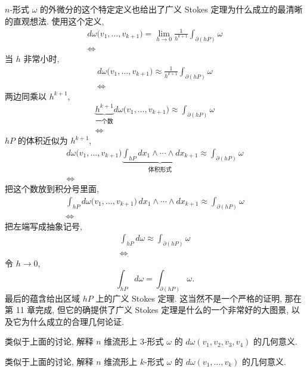 $n$-形式 $\omega$ 的外微分的这个特定定义也给出了广义 Stokes 定理为什么成立的最清晰的直观想法. 使用这个定义, 
\begin{align*}
d\omega\bigl(v_1,\ldots,v_{k+1}\bigr)=\lim_{h\to 0}\frac{1}{h^{k+1}}\int_{\partial(hP)}\omega \\
\Longleftrightarrow
\end{align*}
当 $h$ 非常小时, 
\begin{align*}
d\omega\bigl(v_1,\ldots,v_{k+1}\bigr)\approx\frac{1}{h^{k+1}}\int_{\partial(hP)}\omega \\
\Longleftrightarrow
\end{align*}
两边同乘以 $h^{k+1}$, 
\begin{align*}
\underbrace{h^{k+1}}_{\text{一个数}}d\omega\bigl(v_1,\ldots,v_{k+1}\bigr)\approx\int_{\partial(hP)}\omega \\
\Longleftrightarrow
\end{align*}
$hP$ 的体积近似为 $h^{k+1}$, 
\begin{align*}
d\omega\bigl(v_1,\ldots,v_{k+1}\bigr)\underbrace{\int_{hP}dx_1\wedge\cdots\wedge dx_{k+1}}_{\text{体积形式}}\approx\int_{\partial(hP)}\omega \\
\Longleftrightarrow
\end{align*}
把这个数放到积分号里面, 
\begin{align*}
\int_{hP}d\omega\bigl(v_1,\ldots,v_{k+1}\bigr)\,dx_1\wedge\cdots\wedge dx_{k+1}\approx\int_{\partial(hP)}\omega \\
\Longleftrightarrow
\end{align*}
把左端写成抽象记号, 
\begin{align*}
\int_{hP}d\omega\approx\int_{\partial(hP)}\omega \\
\Longleftrightarrow
\end{align*}
令 $h\to 0$, 
\[
\int_{hP}d\omega=\int_{\partial(hP)}\omega.
\]
最后的蕴含给出区域 $hP$ 上的广义 Stokes 定理. 这当然不是一个严格的证明, 那在第 11 章完成, 但它的确提供了广义 Stokes 定理是什么的一个非常好的大图景, 以及它为什么成立的合理几何论证.

\begin{question}\label{q:4-9}
类似于上面的讨论, 解释 $n$ 维流形上 3-形式 $\omega$ 的 $d\omega(v_1,v_2,v_3,v_4)$ 的几何意义.
\end{question}

\begin{question}\label{q:4-10}
类似于上面的讨论, 解释 $n$ 维流形上 $k$-形式 $\omega$ 的 $d\omega(v_1,\ldots,v_k)$ 的几何意义.
\end{question}

